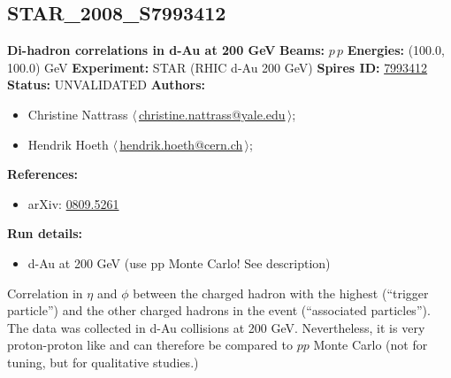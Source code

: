 \subsection[STAR\_2008\_S7993412]{STAR\_2008\_S7993412\,\cite{Nattrass:2008tw}}
\textbf{Di-hadron correlations in d-Au at 200 GeV}\newline
\textbf{Beams:} $p$\,$p$ \newline
\textbf{Energies:} (100.0, 100.0) GeV \newline
\textbf{Experiment:} STAR (RHIC d-Au 200 GeV) \newline
\textbf{Spires ID:} \href{http://www.slac.stanford.edu/spires/find/hep/www?rawcmd=key+7993412}{7993412}\newline
\textbf{Status:} UNVALIDATED\newline
\textbf{Authors:}
\begin{itemize}
  \item Christine Nattrass $\langle\,$\href{mailto:christine.nattrass@yale.edu}{christine.nattrass@yale.edu}$\,\rangle$;
  \item Hendrik Hoeth $\langle\,$\href{mailto:hendrik.hoeth@cern.ch}{hendrik.hoeth@cern.ch}$\,\rangle$;
\end{itemize}
\textbf{References:}
\begin{itemize}
  \item arXiv: \href{http://arxiv.org/abs/0809.5261}{0809.5261}
\end{itemize}
\textbf{Run details:}
\begin{itemize}

  \item d-Au at 200 GeV (use pp Monte Carlo! See description)\end{itemize}

\noindent Correlation in $\eta$ and $\phi$ between the charged hadron with the highest \pT (``trigger particle'') and the other charged hadrons in the event (``associated particles''). The data was collected in d-Au collisions at 200 GeV. Nevertheless, it is very proton-proton like and can therefore be compared to $pp$ Monte Carlo (not for tuning, but for qualitative studies.)

\clearpage


\clearpage

